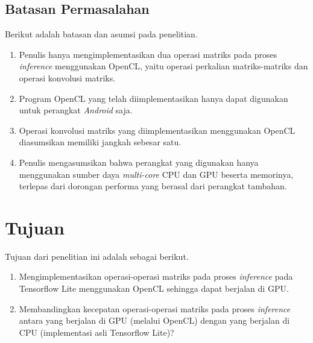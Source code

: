 \subsection{Batasan Permasalahan}
Berikut adalah batasan dan asumsi pada penelitian.
\begin{enumerate}
\item Penulis hanya mengimplementasikan dua operasi matriks pada proses \textit{inference} menggunakan OpenCL, yaitu operasi perkalian matriks-matriks dan operasi konvolusi matriks.
\item Program OpenCL yang telah diimplementasikan hanya dapat digunakan untuk perangkat \textit{Android} saja.
\item Operasi konvolusi matriks yang diimplementasikan menggunakan OpenCL diasumsikan memiliki jangkah sebesar satu.
\item Penulis mengasumsikan bahwa perangkat yang digunakan hanya menggunakan sumber daya \textit{multi-core} CPU dan GPU beserta memorinya, terlepas dari dorongan performa yang berasal dari perangkat tambahan.
\end{enumerate}

\section{Tujuan}
Tujuan dari penelitian ini adalah sebagai berikut.
\begin{enumerate}
\item Mengimplementasikan operasi-operasi matriks pada proses \textit{inference} pada Tensorflow Lite menggunakan OpenCL sehingga dapat berjalan di GPU.
\item Membandingkan kecepatan operasi-operasi matriks pada proses \textit{inference} antara yang berjalan di GPU (melalui OpenCL) dengan yang berjalan di CPU (implementasi asli Tensorflow Lite)?
\end{enumerate}



